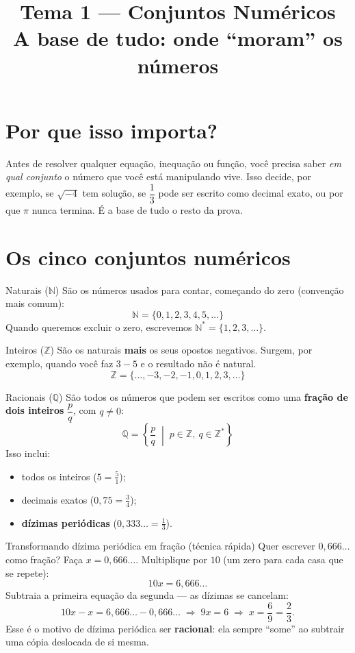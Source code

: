 \documentclass[12pt,a4paper]{article}
\title{\vspace{-1.5cm}\textbf{Tema 1 — Conjuntos Numéricos}\\[2pt]\large A base de tudo: onde ``moram'' os números}
\author{}
\date{}
\begin{document}
\maketitle
\thispagestyle{empty}

\section*{Por que isso importa?}
Antes de resolver qualquer equação, inequação ou função, você precisa saber
\emph{em qual conjunto} o número que você está manipulando vive. Isso decide,
por exemplo, se $\sqrt{-4}$ tem solução, se $\dfrac{1}{3}$ pode ser escrito
como decimal exato, ou por que $\pi$ nunca termina. É a base de tudo o resto
da prova.

\section{Os cinco conjuntos numéricos}

\begin{definicao}{Naturais ($\mathbb{N}$)}
São os números usados para contar, começando do zero (convenção mais comum):
\[
\mathbb{N} = \{0, 1, 2, 3, 4, 5, \dots\}
\]
Quando queremos excluir o zero, escrevemos $\mathbb{N}^{*} = \{1,2,3,\dots\}$.
\end{definicao}

\begin{definicao}{Inteiros ($\mathbb{Z}$)}
São os naturais \textbf{mais} os seus opostos negativos. Surgem, por exemplo,
quando você faz $3 - 5$ e o resultado não é natural.
\[
\mathbb{Z} = \{\dots, -3, -2, -1, 0, 1, 2, 3, \dots\}
\]
\end{definicao}

\begin{definicao}{Racionais ($\mathbb{Q}$)}
São todos os números que podem ser escritos como uma \textbf{fração de dois
inteiros} $\dfrac{p}{q}$, com $q \neq 0$:
\[
\mathbb{Q} = \left\{ \dfrac{p}{q} \;\middle|\; p \in \mathbb{Z},\ q \in \mathbb{Z}^{*} \right\}
\]
Isso inclui:
\begin{itemize}[nosep]
  \item todos os inteiros ($5 = \frac{5}{1}$);
  \item decimais exatos ($0{,}75 = \frac{3}{4}$);
  \item \textbf{dízimas periódicas} ($0{,}333\ldots = \frac{1}{3}$).
\end{itemize}
\end{definicao}

\begin{exemplo}{Transformando dízima periódica em fração (técnica rápida)}
Quer escrever $0{,}666\ldots$ como fração? Faça $x = 0{,}666\ldots$.
Multiplique por $10$ (um zero para cada casa que se repete):
\[
10x = 6{,}666\ldots
\]
Subtraia a primeira equação da segunda — as dízimas se cancelam:
\[
10x - x = 6{,}666\ldots - 0{,}666\ldots \;\Rightarrow\; 9x = 6 \;\Rightarrow\; x = \frac{6}{9} = \frac{2}{3}.
\]
Esse é o motivo de dízima periódica ser \textbf{racional}: ela sempre ``some''
ao subtrair uma cópia deslocada de si mesma.
\end{exemplo}
\end{document}
